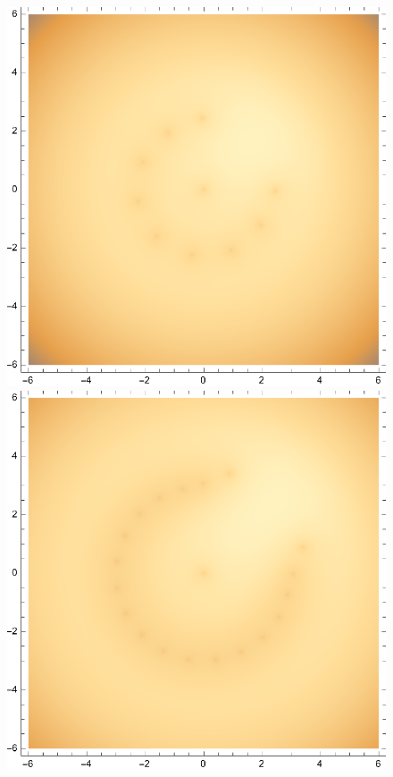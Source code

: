 \documentclass{article}
\theoremstyle{definition}
\begin{document}
\begin{enumerate}[label=\alph*)]
\begin{figure}[!htb]
\begin{minipage}{.24\textwidth}
  	\includegraphics[width=.7\linewidth]{figures/3-N-10-log.eps}
	\end{minipage}
	\begin{minipage}{.24\textwidth}
  	\centering
  	\includegraphics[width=.7\linewidth]{figures/3-N-20-log.eps}
	\end{minipage}
	\end{figure}
	

\end{enumerate}
\end{document}
